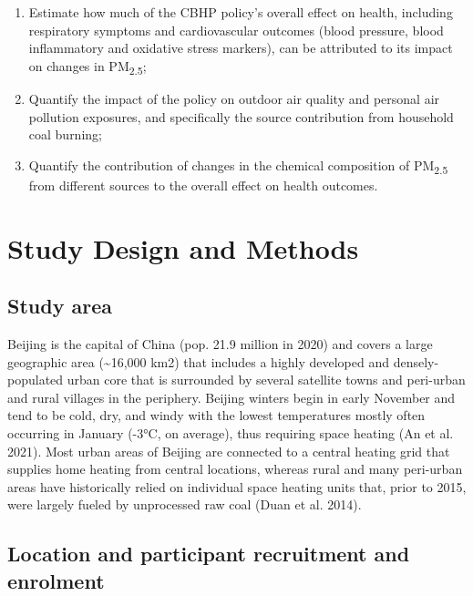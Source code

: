\documentclass[
  letterpaper,
  DIV=11,
  numbers=noendperiod]{scrartcl}
\begin{document}
\begin{enumerate}
\def\labelenumi{\arabic{enumi}.}
\item
  Estimate how much of the CBHP policy's overall effect on health,
  including respiratory symptoms and cardiovascular outcomes (blood
  pressure, blood inflammatory and oxidative stress markers), can be
  attributed to its impact on changes in PM\textsubscript{2.5};
\item
  Quantify the impact of the policy on outdoor air quality and personal
  air pollution exposures, and specifically the source contribution from
  household coal burning;
\item
  Quantify the contribution of changes in the chemical composition of
  PM\textsubscript{2.5} from different sources to the overall effect on
  health outcomes.
\end{enumerate}

\hypertarget{study-design-and-methods}{%
\section{Study Design and Methods}\label{study-design-and-methods}}

\hypertarget{study-area}{%
\subsection{Study area}\label{study-area}}

Beijing is the capital of China (pop. 21.9 million in 2020) and covers a
large geographic area (\textasciitilde16,000 km2) that includes a highly
developed and densely-populated urban core that is surrounded by several
satellite towns and peri-urban and rural villages in the periphery.
Beijing winters begin in early November and tend to be cold, dry, and
windy with the lowest temperatures mostly often occurring in January
(-3°C, on average), thus requiring space heating (An et al. 2021). Most
urban areas of Beijing are connected to a central heating grid that
supplies home heating from central locations, whereas rural and many
peri-urban areas have historically relied on individual space heating
units that, prior to 2015, were largely fueled by unprocessed raw coal
(Duan et al. 2014).

\hypertarget{location-and-participant-recruitment-and-enrolment}{%
\subsection{Location and participant recruitment and
enrolment}\label{location-and-participant-recruitment-and-enrolment}}
\end{document}
